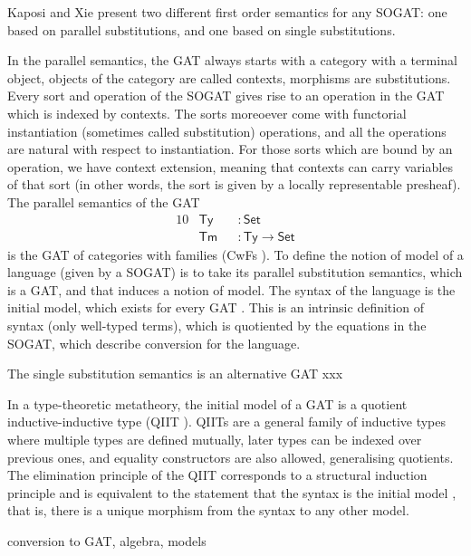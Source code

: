\documentclass[sigplan,10pt,anonymous,review]{acmart}\settopmatter{printfolios=true,printccs=false,printacmref=false}
\newcommand{\ra}{\rightarrow}
\newcommand{\Set}{\mathsf{Set}}
\newcommand{\Ty}{\mathsf{Ty}}
\newcommand{\Tm}{\mathsf{Tm}}
\begin{document}
Kaposi and Xie \cite{DBLP:conf/fscd/KaposiX24} present two different
first order semantics for any SOGAT: one based on parallel
substitutions, and one based on single substitutions.

In the parallel semantics, the GAT always starts with a category with
a terminal object, objects of the category are called contexts,
morphisms are substitutions. Every sort and operation of the SOGAT
gives rise to an operation in the GAT which is indexed by
contexts. The sorts moreoever come with functorial instantiation
(sometimes called substitution) operations, and all the operations are
natural with respect to instantiation. For those sorts which are bound
by an operation, we have context extension, meaning that contexts can
carry variables of that sort (in other words, the sort is given by a
locally representable presheaf). The parallel semantics of the GAT
\begin{alignat*}{10}
  & \Ty && : \Set \\
  & \Tm && : \Ty \ra\Set 
\end{alignat*}
is the GAT of categories with families (CwFs
\cite{DBLP:conf/types/Dybjer95,Castellan2021}). To define the notion
of model of a language (given by a SOGAT) is to take its parallel
substitution semantics, which is a GAT, and that induces a notion of
model. The syntax of the language is the initial model, which exists
for every GAT \cite{DBLP:journals/pacmpl/KaposiKA19}. This is an
intrinsic definition of syntax (only well-typed terms), which is
quotiented by the equations in the SOGAT, which describe conversion
for the language.

The single substitution semantics is an alternative GAT xxx





In a type-theoretic metatheory,
the initial model of a GAT is a quotient inductive-inductive type
(QIIT \cite{DBLP:journals/pacmpl/KaposiKA19}). QIITs are a general
family of inductive types where multiple types are defined mutually,
later types can be indexed over previous ones, and equality
constructors are also allowed, generalising quotients. The elimination
principle of the QIIT corresponds to a structural induction principle
and is equivalent to the statement that the syntax is the initial
model \cite{DBLP:journals/pacmpl/KaposiKA19}, that is, there is a
unique morphism from the syntax to any other model.

conversion to GAT, algebra, models
\end{document}
